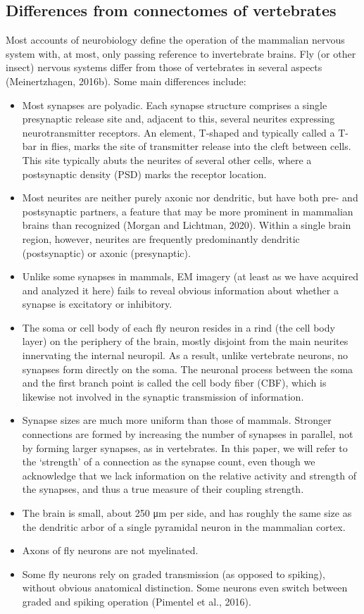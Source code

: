 \documentclass{article}
\begin{document}
\subsection*{Differences from connectomes of vertebrates}

Most accounts of neurobiology define the operation of the mammalian nervous system with, at most, only passing reference to invertebrate brains. Fly (or other insect) nervous systems differ from those of vertebrates in several aspects (Meinertzhagen, 2016b). Some main differences include:

\begin{itemize}
\item Most synapses are polyadic. Each synapse structure comprises a single presynaptic release site and, adjacent to this, several neurites expressing neurotransmitter receptors. An element, T-shaped and typically called a T-bar in flies, marks the site of transmitter release into the cleft between cells. This site typically abuts the neurites of several other cells, where a postsynaptic density (PSD) marks the receptor location.
\item Most neurites are neither purely axonic nor dendritic, but have both pre- and postsynaptic partners, a feature that may be more prominent in mammalian brains than recognized (Morgan and Lichtman, 2020). Within a single brain region, however, neurites are frequently predominantly dendritic (postsynaptic) or axonic (presynaptic).
\item Unlike some synapses in mammals, EM imagery (at least as we have acquired and analyzed it here) fails to reveal obvious information about whether a synapse is excitatory or inhibitory.
\item The soma or cell body of each fly neuron resides in a rind (the cell body layer) on the periphery of the brain, mostly disjoint from the main neurites innervating the internal neuropil. As a result, unlike vertebrate neurons, no synapses form directly on the soma. The neuronal process between the soma and the first branch point is called the cell body fiber (CBF), which is likewise not involved in the synaptic transmission of information.
\item Synapse sizes are much more uniform than those of mammals. Stronger connections are formed by increasing the number of synapses in parallel, not by forming larger synapses, as in vertebrates. In this paper, we will refer to the ‘strength’ of a connection as the synapse count, even though we acknowledge that we lack information on the relative activity and strength of the synapses, and thus a true measure of their coupling strength.
\item The brain is small, about 250 μm per side, and has roughly the same size as the dendritic arbor of a single pyramidal neuron in the mammalian cortex.
\item Axons of fly neurons are not myelinated.
\item Some fly neurons rely on graded transmission (as opposed to spiking), without obvious anatomical distinction. Some neurons even switch between graded and spiking operation (Pimentel et al., 2016).
\end{itemize}
\end{document}
